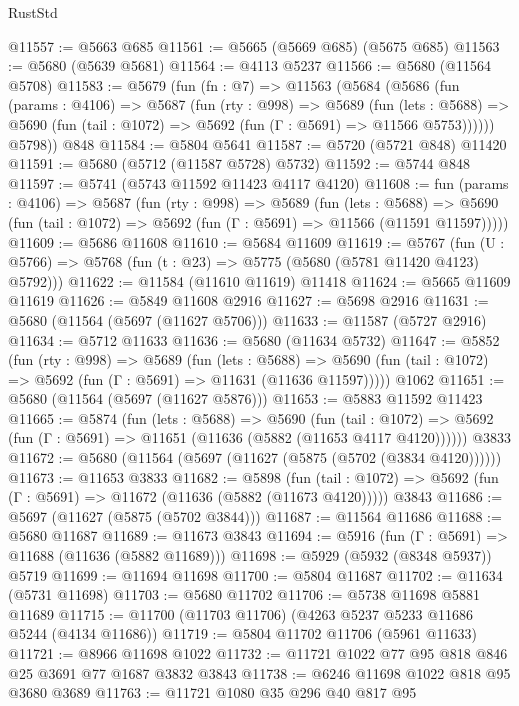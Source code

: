 \begin{lexlean}{RustStd}
\begin{coremodule}
@11557 := @5663 @685
@11561 := @5665 (@5669 @685) (@5675 @685)
@11563 := @5680 (@5639 @5681)
@11564 := @4113 @5237
@11566 := @5680 (@11564 @5708)
@11583 := @5679
    (fun (fn : @7) =>
    @11563
      (@5684
        (@5686
          (fun (params : @4106) =>
          @5687
            (fun (rty : @998) =>
            @5689
              (fun (lets : @5688) =>
              @5690 (fun (tail : @1072) => @5692 (fun (Γ : @5691) => @11566 @5753))))))
        @5798))
    @848
@11584 := @5804 @5641
@11587 := @5720 (@5721 @848) @11420
@11591 := @5680 (@5712 (@11587 @5728) @5732)
@11592 := @5744 @848
@11597 := @5741 (@5743 @11592 @11423 @4117 @4120)
@11608 := fun (params : @4106) =>
  @5687
    (fun (rty : @998) =>
    @5689
      (fun (lets : @5688) =>
      @5690 (fun (tail : @1072) => @5692 (fun (Γ : @5691) => @11566 (@11591 @11597)))))
@11609 := @5686 @11608
@11610 := @5684 @11609
@11619 := @5767
    (fun (U : @5766) => @5768 (fun (t : @23) => @5775 (@5680 (@5781 @11420 @4123) @5792)))
@11622 := @11584 (@11610 @11619) @11418
@11624 := @5665 @11609 @11619
@11626 := @5849 @11608 @2916
@11627 := @5698 @2916
@11631 := @5680 (@11564 (@5697 (@11627 @5706)))
@11633 := @11587 (@5727 @2916)
@11634 := @5712 @11633
@11636 := @5680 (@11634 @5732)
@11647 := @5852
    (fun (rty : @998) =>
    @5689
      (fun (lets : @5688) =>
      @5690 (fun (tail : @1072) => @5692 (fun (Γ : @5691) => @11631 (@11636 @11597)))))
    @1062
@11651 := @5680 (@11564 (@5697 (@11627 @5876)))
@11653 := @5883 @11592 @11423
@11665 := @5874
    (fun (lets : @5688) =>
    @5690
      (fun (tail : @1072) =>
      @5692 (fun (Γ : @5691) => @11651 (@11636 (@5882 (@11653 @4117 @4120))))))
    @3833
@11672 := @5680 (@11564 (@5697 (@11627 (@5875 (@5702 (@3834 @4120))))))
@11673 := @11653 @3833
@11682 := @5898
    (fun (tail : @1072) => @5692 (fun (Γ : @5691) => @11672 (@11636 (@5882 (@11673 @4120)))))
    @3843
@11686 := @5697 (@11627 (@5875 (@5702 @3844)))
@11687 := @11564 @11686
@11688 := @5680 @11687
@11689 := @11673 @3843
@11694 := @5916 (fun (Γ : @5691) => @11688 (@11636 (@5882 @11689)))
@11698 := @5929 (@5932 (@8348 @5937)) @5719
@11699 := @11694 @11698
@11700 := @5804 @11687
@11702 := @11634 (@5731 @11698)
@11703 := @5680 @11702
@11706 := @5738 @11698 @5881 @11689
@11715 := @11700 (@11703 @11706) (@4263 @5237 @5233 @11686 @5244 (@4134 @11686))
@11719 := @5804 @11702 @11706 (@5961 @11633)
@11721 := @8966 @11698 @1022
@11732 := @11721 @1022 @77 @95 @818 @846 @25 @3691 @77 @1687 @3832 @3843
@11738 := @6246 @11698 @1022 @818 @95 @3680 @3689
@11763 := @11721
    @1080
    @35
    @296
    @40
    @817
    @95

\end{coremodule}
\end{lexlean}
